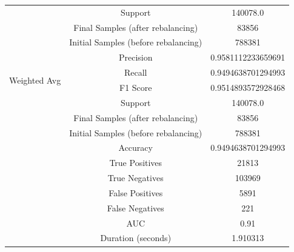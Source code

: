 \begin{longtable}{|c|c|c|}
 & Support & 140078.0 \\
 & Final Samples (after rebalancing) & 83856 \\
 & Initial Samples (before rebalancing) & 788381 \\
\hline
\multirow{4}{*}{Weighted Avg} & Precision & 0.9581112233659691 \\
 & Recall & 0.9494638701294993 \\
 & F1 Score & 0.9514893572928468 \\
 & Support & 140078.0 \\
 & Final Samples (after rebalancing) & 83856 \\
 & Initial Samples (before rebalancing) & 788381 \\
\hline
& Accuracy & 0.9494638701294993 \\ \hline
& True Positives & 21813 \\ \hline
& True Negatives & 103969 \\ \hline
& False Positives & 5891 \\ \hline
& False Negatives & 221 \\ \hline
& AUC & 0.91 \\ \hline
& Duration (seconds) & 1.910313 \\ \hline
\end{longtable}



